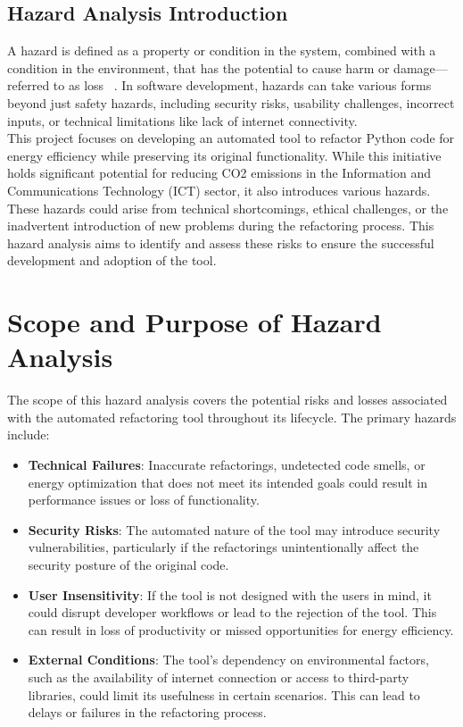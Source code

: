 \documentclass{article}
\newcounter{hazard}
\begin{document}
\subsection{Hazard Analysis Introduction}

A hazard is defined as a property or condition in the system, 
combined with a condition in the environment, that has the potential to cause harm 
or damage—referred to as loss ~\citep{Leveson2021}. In software development, hazards can take various 
forms beyond just safety hazards, including security risks, usability challenges, 
incorrect inputs, or technical limitations like lack of internet connectivity.
\\

This project focuses on developing an automated tool to refactor Python code 
for energy efficiency while preserving its original functionality. While this 
initiative holds significant potential for reducing CO2 emissions in the 
Information and Communications Technology (ICT) sector, it also introduces 
various hazards. These hazards could arise from technical shortcomings, ethical 
challenges, or the inadvertent introduction of new problems during the refactoring 
process. This hazard analysis aims to identify and assess these risks to ensure 
the successful development and adoption of the tool.

\section{Scope and Purpose of Hazard Analysis}

The scope of this hazard analysis covers the potential risks and losses associated 
with the automated refactoring tool throughout its lifecycle. The primary hazards include:

\begin{itemize}

    \item \textbf{Technical Failures}: Inaccurate refactorings, undetected code 
    smells, or energy optimization that does not meet its intended goals could 
    result in performance issues or loss of functionality. 

    \item \textbf{Security Risks}: The automated nature of the tool may introduce 
    security vulnerabilities, particularly if the refactorings unintentionally 
    affect the security posture of the original code.

    \item \textbf{User Insensitivity}: If the tool is not designed with the users 
    in mind, it could disrupt developer workflows or lead to the rejection of the 
    tool. This can result in loss of productivity or missed opportunities for 
    energy efficiency.

    \item \textbf{External Conditions}: The tool’s dependency on environmental 
    factors, such as the availability of internet connection or access to 
    third-party libraries, could limit its usefulness in certain scenarios. 
    This can lead to delays or failures in the refactoring process.

\end{itemize}
\end{document}
